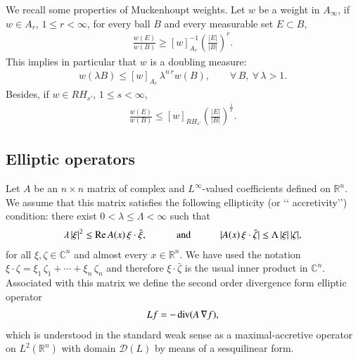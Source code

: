 \documentclass[11pt, a4paper,leqno]{amsart}
\theoremstyle{plain}
\theoremstyle{definition}
\theoremstyle{remark}
\numberwithin{equation}{section}
\def \R{ \mathbb{R} }
\def\div{\mathop{\rm div}}
\renewcommand{\Re}{{\rm Re}\,}
\begin{document}
We recall some properties of Muckenhoupt weights. Let $w$ be a  weight in $A_{\infty}$,
if $w\in A_{r}$, $1\leq r<\infty$,
for every ball $B$ and every measurable set $E\subset B$,
\begin{align}\label{pesosineq:Ap}
\frac{w(E)}{w(B)}\ge [w]_{A_{r}}^{-1}\left(\frac{|E|}{|B|}\right)^{r}.
\end{align}
This implies in particular that $w$ is a doubling measure:
\begin{align}\label{doublingcondition}
w(\lambda B)
\le
[w]_{A_r}\,\lambda^{n\,r}w(B),
\qquad \forall\,B,\ \forall\,\lambda>1.
\end{align}
Besides, if $w\in RH_{s'}$, $1\leq s<\infty$,
\begin{align}\label{pesosineq:RHq}
\frac{w(E)}{w(B)}
\leq
[w]_{RH_{s'}}\left(\frac{|E|}{|B|}\right)^{\frac{1}{s}}.
\end{align}
%
\subsection{Elliptic operators}
%
%
Let $A$ be an $n\times n$ matrix of complex and
$L^\infty$-valued coefficients defined on $\R^n$. We assume that
this matrix satisfies the following ellipticity (or \lq\lq
accretivity\rq\rq) condition: there exist
$0<\lambda\le\Lambda<\infty$ such that
\begin{align}\label{matrix:Aproperties}
\lambda\,|\xi|^2
\le
\Re A(x)\,\xi\cdot\bar{\xi},
\quad\qquad\mbox{and}\qquad\quad
|A(x)\,\xi\cdot \bar{\zeta}|
\le
\Lambda\,|\xi|\,|\zeta|,
\end{align}
for all $\xi,\zeta\in\mathbb{C}^n$ and almost every $x\in \R^n$. We have used the notation
$\xi\cdot\zeta=\xi_1\,\zeta_1+\cdots+\xi_n\,\zeta_n$ and therefore
$\xi\cdot\bar{\zeta}$ is the usual inner product in $\mathbb{C}^n$. 
Associated with this matrix we define the second order divergence
form elliptic operator
\begin{align}\label{matrix:A}
L f
=
-\div(A\,\nabla f),
\end{align}
which is understood in the standard weak sense as a maximal-accretive operator on $L^2(\R^n)$ with domain $\mathcal{D}(L)$ by means of a
sesquilinear form.
\end{document}
